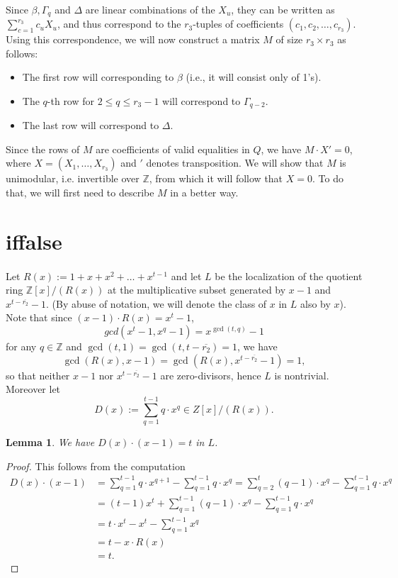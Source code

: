 \documentclass[12pt,a4paper]{article}
\newtheorem{lemma}[theorem]{Lemma}
\theoremstyle{definition}
\newcommand{\Z}{\mathbb{Z}}
\newcommand{\uo}{\overline{r_2}}
\begin{document}
\paragraph*{}
Since $\beta,\Gamma_q$ and $\Delta$ are linear combinations of the $X_u$, they can be written as $\sum_{c=1}^{r_3}c_uX_u$, and thus
correspond to the $r_3$-tuples of coefficients $(c_1,c_2,\dots,c_{r_3})$. Using this correspondence, we will now construct a matrix $M$ of size $r_3\times r_3$ as follows:
\begin{itemize}
\item The first row will corresponding to $\beta$ (i.e., it will consist only of 1's).
\item The $q$-th row for $2\leq q\leq r_3-1$ will correspond to $\Gamma_{q-2}$.
\item The last row will correspond to $\Delta$.
\end{itemize}

Since the rows of $M$ are coefficients of valid equalities in $Q$, we have $M\cdot X'=0$, where $X=(X_1,\dots,X_{r_3})$ and $'$ denotes transposition. We will show that $M$ is unimodular, i.e. invertible over $\Z$, from which it will follow that $X=0$. To do that, we will first need to describe $M$ in a better way.

\iffalse
\section{iffalse}
\paragraph*{}
Let  $R(x):=1+x+x^2+\dots+x^{t-1}$ and let $L$ be the localization of the quotient ring $\Z[x]/(R(x))$ at the multiplicative subset generated by $x-1$ and $x^{t-\uo}-1$. (By abuse of notation, we will denote the class of $x$ in $L$ also by $x$). Note that since $(x-1)\cdot R(x)=x^t-1$, $$gcd(x^t-1,x^q-1)=x^{\gcd(t,q)}-1$$ for any $q\in\Z$ and $\gcd(t,1)=\gcd(t,t-\uo)=1$, we have $$\gcd(R(x),x-1)=\gcd(R(x),x^{t-\uo}-1)=1,$$ so that neither $x-1$ nor $x^{t-\uo}-1$ are zero-divisors, hence $L$ is nontrivial. Moreover let $$D(x):=\sum_{q=1}^{t-1}q\cdot x^q\in Z[x]/(R(x)).$$

\begin{lemma}
We have $D(x)\cdot(x-1)=t$ in $L$.
\end{lemma}
\begin{proof}
This follows from the computation
\begin{equation*}
\begin{split}
D(x)\cdot(x-1)&=\sum_{q=1}^{t-1} q\cdot x^{q+1}-\sum_{q=1}^{t-1} q\cdot x^q=\sum_{q=2}^{t} (q-1)\cdot x^{q}-\sum_{q=1}^{t-1} q\cdot x^q\\
&=(t-1)x^t+\sum_{q=1}^{t-1} (q-1)\cdot x^{q}-\sum_{q=1}^{t-1} q\cdot x^q\\
&=t\cdot x^t-x^t-\sum_{q=1}^{t-1} x^{q}\\
&=t-x\cdot R(x)\\
&=t.
\end{split}
\end{equation*}
\end{proof}
\end{document}
